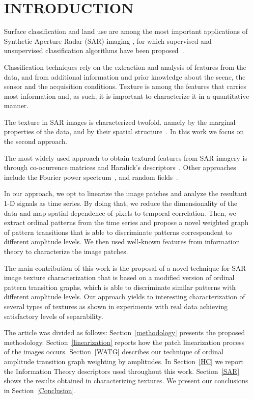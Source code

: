 \documentclass{isprs}
\begin{document}
\section{INTRODUCTION}\label{Intro}

Surface classification and land use are among the most important applications of Synthetic Aperture Radar (SAR) imaging \cite{Pottier2004Unsupervised}, for which supervised and unsupervised classification algorithms have been proposed~\cite{han2020unsupervised,huang2020classification,xie2020polsar}.

Classification techniques rely on the extraction and analysis of features from the data, and from additional information and prior knowledge about  the scene, the sensor and the acquisition conditions.
Texture is among the features that carries most information and, as such, it is important to characterize it in a quantitative manner.

The texture in SAR images is characterized twofold, namely by the marginal properties of the data, and by their spatial structure~\cite{numbisi2018multi}.
In this work we focus on the second approach.

The most widely used approach to obtain textural features from SAR imagery is through co-ocurrence matrices and Haralick's descriptors~\cite{yu2019detection}.
Other approaches include the Fourier power spectrum~\cite{Florindo2012Fractal}, and
random fields~\cite{zhu2016antarctic}.

In our approach, we opt to linearize the image patches and analyze the resultant 1-D signals as time series. 
By doing that, we reduce the dimensionality of the data and map spatial dependence of pixels to temporal correlation. 
Then, we extract ordinal patterns from the time series and propose a novel weighted graph of pattern transitions that is able to discriminate patterns correspondent to different amplitude levels. 
We then used well-known features from information theory to characterize the image patches. 
	
The main contribution of this work is the proposal of a novel technique for SAR image texture characterization that is based on a modified version of ordinal pattern transition graphs, which is able to discriminate similar patterns with different amplitude levels. 
Our approach yields to interesting characterization of several types of textures as shown in experiments with real data achieving satisfactory levels of separability.

The article was divided as follows:
Section~\ref{methodology} presents the proposed methodology.
Section~\ref{linearization} reports how the patch linearization process of the images occurs.
Section~\ref{WATG} describes our technique of ordinal amplitude transition graph weighting by amplitudes.
In Section~\ref{HC} we report the Information Theory descriptors used throughout this work.
Section~\ref{SAR} shows the results obtained in characterizing textures.
We present our conclusions in Section~\ref{Conclusion}.
\end{document}
